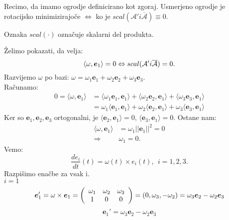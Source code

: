 \documentclass[mat1]{fmfdelo}
\newcommand{\e}{\boldsymbol e}
\newcommand{\A}{\mathcal A}
\begin{document}
\begin{trditev} Recimo, da imamo ogrodje definicirano kot zgoraj.
	Usmerjeno ogrodje je rotacijsko minimizirajoče $\Leftrightarrow$ ko je $scal(\A' i\overline{\A})\equiv0$.
\end{trditev}
\begin{opomba}
	Oznaka $scal(\cdot)$ označuje skalarni del produkta.
\end{opomba}
\begin{dokaz}
Želimo pokazati, da velja:
\begin{equation}
\langle \omega,\e_1\rangle = 0 \Leftrightarrow scal(\A' \\i\overline{\A}) = 0.
\end{equation}
Razvijemo $\omega$ po bazi: $\omega = \omega_1\e_1+\omega_2\e_2+\omega_3\e_3$. \\
Računamo:
\begin{equation*}
\begin{split}
0 = \langle \omega, \e_1 \rangle &= \langle \omega_1\e_1,\e_1\rangle + \langle \omega_2\e_2,\e_1\rangle + \langle \omega_3\e_3,\e_1\rangle \\
&= \omega_1\langle \e_1,\e_1\rangle + \omega_2\langle \e_2,\e_1\rangle + \omega_3\langle \e_3,\e_1\rangle
\end{split}
\end{equation*}
Ker so $\e_1,\e_2,\e_3$ ortogonalni, je  $\langle \e_2,\e_1\rangle = 0$, $\langle \e_3,\e_1\rangle=0$.
Ostane nam:
\begin{equation*}
\begin{split}
\langle \omega,\e_1 \rangle &=\omega_1 || \e_1 ||^2 = 0 \\
\Rightarrow ~~ & \omega_1 = 0.
\end{split}
\end{equation*}
Vemo:
\begin{equation*}
\frac{de_i}{dt}(t) = \omega(t) \times e_i(t), ~~ i=1,2,3.
\end{equation*}
Razpišimo enačbe za vsak i.\\
$i=1$
\begin{equation*}
\e_1' = \omega \times \e_1 = \left(
\begin{array}{c c c}
\omega_1 & \omega_2 & \omega_3 \\
1 & 0 & 0
\end{array} \right)
= (0, \omega_3,-\omega_2) = \omega_3\e_2 - \omega_2\e_3
\end{equation*}
\begin{equation*}
\e_1' = \omega_3\e_2-\omega_2\e_3

\end{equation*}
\end{dokaz}
\end{document}
